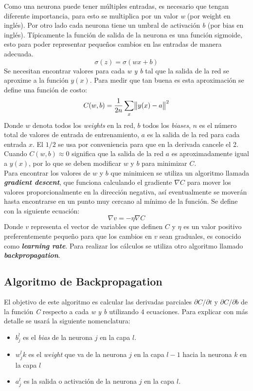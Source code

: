 \documentclass[12pt,spanish]{article}
\begin{document}
	Como una neurona puede tener múltiples entradas, es necesario que tengan diferente importancia, para esto se multiplica por un valor  \textit{w} (por weight en inglés). Por otro lado cada neurona tiene un umbral de activación \textit{b} (por bias en inglés). Típicamente la función de salida de la neurona es una función sigmoide, esto para poder representar pequeños cambios en las entradas de manera adecuada.
	\[ \sigma(z) = \sigma(wx + b) \tag{1}\]
	Se necesitan encontrar valores para cada \textit{w y b} tal que la salida de la red se aproxime a la función $ y(x)$. Para medir que tan buena es esta aproximación se define una función de costo:
	\[ C(w,b) = \frac{1}{2n}\sum\limits_{x} \norm{y(x) - a}^2 \]
	Donde $ w $ denota todos los \textit{weights} en la red, $ b $ todos los \textit{biases}, $ n $ es el número total de valores de entrada de entrenamiento, $ a $ es la salida de la red para cada entrada $ x $. El $ 1/2 $ se usa por conveniencia para que en la derivada cancele el 2. Cuando $ C(w,b) \approx 0 $ significa que la salida de la red $ a $ es aproximadamente igual a $ y(x) $, por lo que se deben modificar $ w $ y $b$ para minimizar $ C $.\\
	Para encontrar los valores de $w$ y $b$ que minimicen se utiliza un algoritmo llamada \textbf{\textit{gradient descent}}, que funciona calculando el gradiente $ \nabla C$ para mover los valores proporcionalmente en la dirección negativa, así eventualmente se moverán hasta encontrarse en un punto muy cercano al mínimo de la función. Se define con la siguiente ecuación:
	\[ \nabla v = -\eta\nabla C \]
	Donde $v$ representa el vector de variables que definen $C$ y $\eta$ es un valor positivo preferentemente pequeño para que los cambios en $v$ sean graduales, es conocido como \textbf{\textit{learning rate}}. Para realizar los cálculos se utiliza otro algoritmo llamado \textbf{\textit{backpropagation}}.
	\subsection{Algoritmo de Backpropagation}
	El objetivo de este algoritmo es calcular las derivadas parciales $ \partial{C}/\partial{t} $ y $ \partial{C}/\partial{b} $ de la función \textit{C} respecto a cada \textit{w y b} utilizando 4 ecuaciones. Para explicar con más detalle se usará la siguiente nomenclatura:
	\begin{itemize}
		\item $b^l_j$ es el \textit{bias} de la neurona $j$ en la capa $l$.
		\item $w^l_jk$ es el \textit{weight} que va de la neurona $j$ en la capa $l-1$ hacia la neurona $k$ en la capa $l$
		\item $a^l_j$ es la salida o activación de la neurona $j$ en la capa $l$.
	\end{itemize}
		
\end{document}
